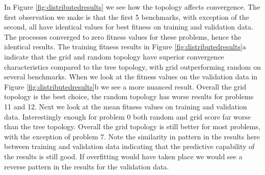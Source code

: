 In Figure \ref{fig:distributedresults} we see how the topology affects convergence. The first observation we make is that the first 5 benchmarks, with exception of the second, all have identical values for best fitness on training and validation data. The processes converged to zero fitness values for these problems, hence the identical results. The training fitness results in Figure \ref{fig:distributedresults}a indicate that the grid and random topology have superior convergence characteristics compared to the tree topology, with grid outperforming random on several benchmarks. When we look at the fitness values on the validation data in Figure \ref{fig:distributedresults}b we see a more nuanced result. Overall the grid topology is the best choice, the random topology has worse results for problems 11 and 12. Next we look at the mean fitness values on training and validation data. Interestingly enough for problem 0 both random and grid score far worse than the tree topology. Overall the grid topology is still better for most problems, with the exception of problem 7. Note the similarity in pattern in the results here between training and validation data indicating that the predictive capability of the results is still good. If overfitting would have taken place we would see a reverse pattern in the results for the validation data.

